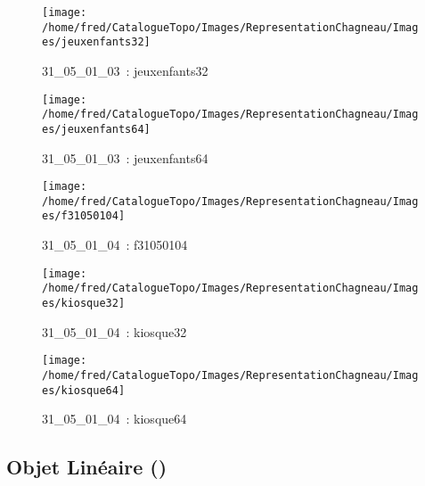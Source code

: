 \documentclass[12pt,titlepage]{book}
\begin{document}
\begin{figure}[h!]
\begin{minipage}[t]{3cm}
    \begin{center}
      \texttt{[image: /home/fred/CatalogueTopo/Images/RepresentationChagneau/Images/jeuxenfants32]}
      \caption[~31\_05\_01\_03]{\small{31\_05\_01\_03~:} \tiny{jeuxenfants32}}\label{jeuxenfants32}
    \end{center}
  \end{minipage}
  \begin{minipage}[t]{3cm}
    \begin{center}
      \texttt{[image: /home/fred/CatalogueTopo/Images/RepresentationChagneau/Images/jeuxenfants64]}
      \caption[~31\_05\_01\_03]{\small{31\_05\_01\_03~:} \tiny{jeuxenfants64}}\label{jeuxenfants64}
    \end{center}
  \end{minipage}
  \begin{minipage}[t]{3cm}
    \begin{center}
      \texttt{[image: /home/fred/CatalogueTopo/Images/RepresentationChagneau/Images/f31050104]}
      \caption[~31\_05\_01\_04]{\small{31\_05\_01\_04~:} \tiny{f31050104}}\label{f31050104}
    \end{center}
  \end{minipage}
  \begin{minipage}[t]{3cm}
    \begin{center}
      \texttt{[image: /home/fred/CatalogueTopo/Images/RepresentationChagneau/Images/kiosque32]}
      \caption[~31\_05\_01\_04]{\small{31\_05\_01\_04~:} \tiny{kiosque32}}\label{kiosque32}
    \end{center}
  \end{minipage}
  \begin{minipage}[t]{3cm}
    \begin{center}
      \texttt{[image: /home/fred/CatalogueTopo/Images/RepresentationChagneau/Images/kiosque64]}
      \caption[~31\_05\_01\_04]{\small{31\_05\_01\_04~:} \tiny{kiosque64}}\label{kiosque64}
    \end{center}
  \end{minipage}
\end{figure}


\subsection{Objet Linéaire ()}
\noindent
\vspace{\baselineskip}
\end{document}
